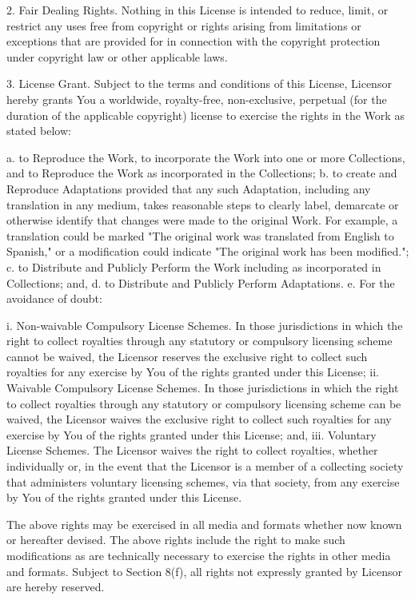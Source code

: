 2. Fair Dealing Rights. Nothing in this License is intended to reduce,
limit, or restrict any uses free from copyright or rights arising from
limitations or exceptions that are provided for in connection with the
copyright protection under copyright law or other applicable laws.

3. License Grant. Subject to the terms and conditions of this License,
Licensor hereby grants You a worldwide, royalty-free, non-exclusive,
perpetual (for the duration of the applicable copyright) license to
exercise the rights in the Work as stated below:

 a. to Reproduce the Work, to incorporate the Work into one or more
    Collections, and to Reproduce the Work as incorporated in the
    Collections;
 b. to create and Reproduce Adaptations provided that any such Adaptation,
    including any translation in any medium, takes reasonable steps to
    clearly label, demarcate or otherwise identify that changes were made
    to the original Work. For example, a translation could be marked "The
    original work was translated from English to Spanish," or a
    modification could indicate "The original work has been modified.";
 c. to Distribute and Publicly Perform the Work including as incorporated
    in Collections; and,
 d. to Distribute and Publicly Perform Adaptations.
 e. For the avoidance of doubt:

     i. Non-waivable Compulsory License Schemes. In those jurisdictions in
        which the right to collect royalties through any statutory or
        compulsory licensing scheme cannot be waived, the Licensor
        reserves the exclusive right to collect such royalties for any
        exercise by You of the rights granted under this License;
    ii. Waivable Compulsory License Schemes. In those jurisdictions in
        which the right to collect royalties through any statutory or
        compulsory licensing scheme can be waived, the Licensor waives the
        exclusive right to collect such royalties for any exercise by You
        of the rights granted under this License; and,
   iii. Voluntary License Schemes. The Licensor waives the right to
        collect royalties, whether individually or, in the event that the
        Licensor is a member of a collecting society that administers
        voluntary licensing schemes, via that society, from any exercise
        by You of the rights granted under this License.

The above rights may be exercised in all media and formats whether now
known or hereafter devised. The above rights include the right to make
such modifications as are technically necessary to exercise the rights in
other media and formats. Subject to Section 8(f), all rights not expressly
granted by Licensor are hereby reserved.

